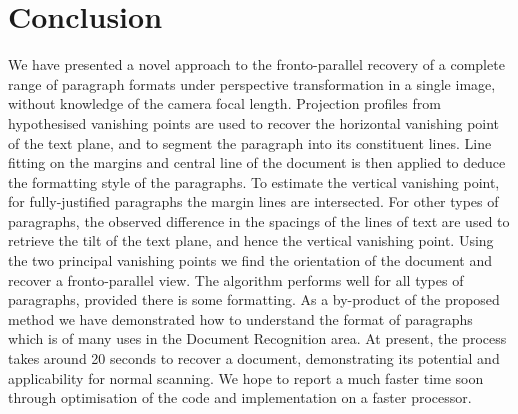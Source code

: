 \documentclass{elsart}   %
\begin{document}





\section{Conclusion} \label{conclusions}
We have presented a novel approach to the fronto-parallel recovery of a complete
range of  paragraph formats under perspective transformation in a
single image, without knowledge of the camera focal length.   Projection
profiles from hypothesised vanishing points are used to  recover the
horizontal vanishing point of the text plane, and to segment the paragraph into
its constituent lines.  Line fitting on the margins and central line of the
document is then applied to deduce the formatting style of the paragraphs.  To
estimate the vertical vanishing point, for fully-justified paragraphs the margin
lines are intersected.  For other types of paragraphs, the observed difference
in the spacings of the lines of text are used to retrieve the tilt of the text
plane, and hence the vertical vanishing point.  Using the two principal
vanishing points we find the orientation of the document and recover a
fronto-parallel view.  The algorithm performs well for all types of paragraphs,
provided there is some  formatting. As a by-product of the proposed
method we have demonstrated how to understand the format of paragraphs which is
 of many uses in the Document Recognition area.
At present, the process takes around 20 seconds to recover a document,
demonstrating its potential and applicability 
for normal scanning. We hope to report a much faster time soon through
optimisation of the code and implementation on a faster processor.

\end{document}
